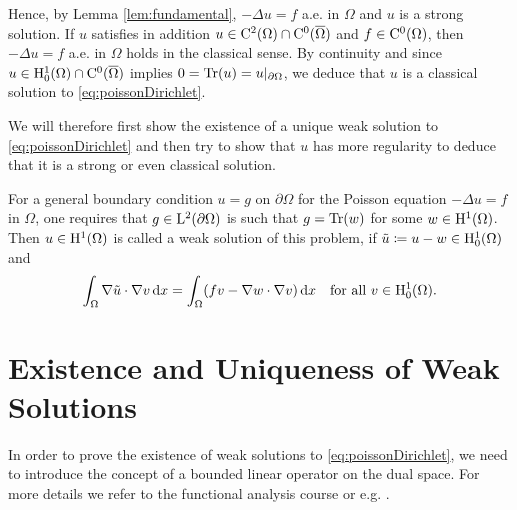 Hence, by Lemma \ref{lem:fundamental}, $-\Delta u = f$ a.e. in $\Omega$ and $u$ is a strong solution. If $u$ satisfies in addition $u \in \mathrm{C}^2(\Omega) \cap \mathrm{C}^0(\overline\Omega)$ and $f \in \mathrm{C}^0(\Omega)$, then $-\Delta u = f$ a.e. in $\Omega$ holds in the classical sense. 
By continuity and since $u \in \mathrm{H}_0^1(\Omega) \cap \mathrm{C}^0(\overline\Omega)$ implies $0 = \operatorname{Tr}(u) = u|_{\partial\Omega}$, we deduce that $u$ is a classical solution to \eqref{eq:poissonDirichlet}.

We will therefore first show the existence of a unique weak solution to \eqref{eq:poissonDirichlet} and then try to show that $u$ has more regularity to deduce that it is a strong or even classical solution.

For a general boundary condition $u = g$ on $\partial\Omega$ for the Poisson equation $-\Delta u = f$ in $\Omega$, one requires that $g \in \mathrm{L}^2(\partial\Omega)$ is such that $g = \operatorname{Tr}(w)$ for some $w \in \mathrm{H}^1(\Omega)$.
Then $u \in \mathrm{H}^1(\Omega)$ is called a weak solution of this problem, if $\tilde u \coloneqq u - w \in \mathrm{H}_0^1(\Omega)$ and 
$$
\int_\Omega \nabla \tilde u \cdot \nabla v \, {\operatorname{d}\!{x}}
= \int_\Omega (f v - \nabla w \cdot \nabla v) \, {\operatorname{d}\!{x}} \quad\text{for all } v \in \mathrm{H}_0^1(\Omega).
$$

\section{Existence and Uniqueness of Weak Solutions}

In order to prove the existence of weak solutions to \eqref{eq:poissonDirichlet}, we need to introduce the concept of a bounded linear operator on the dual space.
For more details we refer to the functional analysis course or e.g. \cite[Sections 2.3, 2.4]{dobrowolski2010angewandte}.

